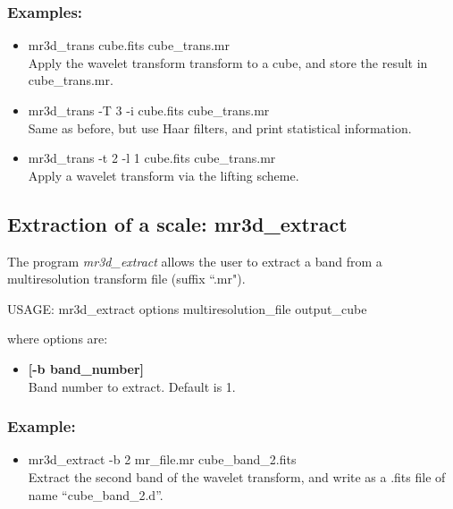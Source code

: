 \subsubsection*{Examples:}
\begin{itemize}
\itemsep=0.1truecm
\item mr3d\_trans cube.fits cube\_trans.mr \\
Apply the wavelet transform transform to a cube, and store the
result in cube\_trans.mr. 
\item mr3d\_trans -T 3 -i cube.fits cube\_trans.mr \\
Same as before, but use Haar filters, and
  print statistical information.
\item mr3d\_trans -t 2 -l 1 cube.fits cube\_trans.mr \\
Apply a wavelet transform via the lifting scheme.
\end{itemize}


\subsection{Extraction of a scale: mr3d\_extract}
\label{sect_extr3d}

The program
{\em mr3d\_extract} allows the user to extract a  band from
a multiresolution transform file (suffix ``.mr").
{\bf
\begin{center}
 USAGE: mr3d\_extract options multiresolution\_file  output\_cube
\end{center}}
where options are:
\begin{itemize}
\itemsep=0.1truecm
 \item {\bf  [-b band\_number] } \\
 Band number to extract. Default is 1.
\end{itemize}
\subsubsection*{Example:}
\begin{itemize}
\item mr3d\_extract -b 2 mr\_file.mr cube\_band\_2.fits \\
Extract the second band of the wavelet transform, and write as a .fits
file of name ``cube\_band\_2.d''.  
\end{itemize}

